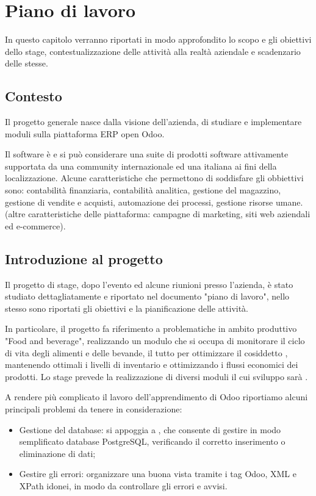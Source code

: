 
\hypertarget{(chap:capitolo2)}{}
\chapter{Piano di lavoro}
In questo capitolo verranno riportati in modo approfondito lo scopo e gli obiettivi dello stage, contestualizzazione delle attività alla realtà aziendale e scadenzario delle stesse.

\section{Contesto}
Il progetto generale nasce dalla visione dell'azienda, di studiare e implementare moduli sulla piattaforma ERP open Odoo.

Il software è  e si può considerare una suite di prodotti software attivamente supportata da una community internazionale ed una italiana ai fini della localizzazione.
Alcune caratteristiche che permettono di soddisfare gli obbiettivi sono: contabilità finanziaria, contabilità analitica, gestione del magazzino, gestione di vendite e acquisti, automazione dei processi, gestione risorse umane. (altre caratteristiche delle piattaforma: campagne di marketing, siti web aziendali ed e-commerce).

\section{Introduzione al progetto}
Il progetto di stage, dopo l'evento  ed alcune riunioni presso l'azienda, è stato studiato dettagliatamente e riportato nel documento "piano di lavoro", nello stesso sono riportati gli obiettivi e la pianificazione delle attività.

In particolare, il progetto fa riferimento a problematiche in ambito produttivo "Food and beverage", realizzando un modulo che si occupa di monitorare il ciclo di vita degli alimenti e delle bevande, il tutto per ottimizzare il cosiddetto , mantenendo ottimali i livelli di inventario e ottimizzando i flussi economici dei prodotti.
Lo stage prevede la realizzazione di diversi moduli il cui sviluppo sarà .

A rendere più complicato il lavoro dell'apprendimento di Odoo riportiamo alcuni principali problemi da tenere in considerazione:
\begin{itemize}
	\item Gestione del database: si appoggia a , che consente di gestire in modo semplificato database PostgreSQL, verificando il corretto inserimento o eliminazione di dati;
	\item Gestire gli errori: organizzare una buona vista tramite i tag Odoo, XML e XPath idonei, in modo da controllare gli errori e avvisi.
\end{itemize}

